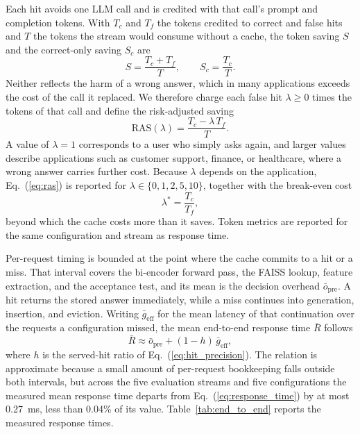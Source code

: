 \documentclass[authoryear,preprint,review,12pt]{elsarticle}
\begin{document}
Each hit avoids one LLM call and is credited with that call's prompt and completion tokens. With $T_c$ and $T_f$ the tokens credited to correct and false hits and $T$ the tokens the stream would consume without a cache, the token saving $S$ and the correct-only saving $S_c$ are
\begin{equation}
S=\frac{T_c+T_f}{T},\qquad S_c=\frac{T_c}{T}.
\label{eq:token_saving}
\end{equation}
Neither reflects the harm of a wrong answer, which in many applications exceeds the cost of the call it replaced. We therefore charge each false hit $\lambda\geq 0$ times the tokens of that call and define the risk-adjusted saving
\begin{equation}
\mathrm{RAS}(\lambda)=\frac{T_c-\lambda\,T_f}{T}.
\label{eq:ras}
\end{equation}
A value of $\lambda=1$ corresponds to a user who simply asks again, and larger values describe applications such as customer support, finance, or healthcare, where a wrong answer carries further cost. Because $\lambda$ depends on the application, Eq.~(\ref{eq:ras}) is reported for $\lambda\in\{0,1,2,5,10\}$, together with the break-even cost
\begin{equation}
\lambda^{*}=\frac{T_c}{T_f},
\label{eq:breakeven}
\end{equation}
beyond which the cache costs more than it saves. Token metrics are reported for the same configuration and stream as response time.

Per-request timing is bounded at the point where the cache commits to a hit or a miss. That interval covers the bi-encoder forward pass, the FAISS lookup, feature extraction, and the acceptance test, and its mean is the decision overhead $\bar{o}_{\mathrm{pre}}$. A hit returns the stored answer immediately, while a miss continues into generation, insertion, and eviction. Writing $\bar{g}_{\mathrm{eff}}$ for the mean latency of that continuation over the requests a configuration missed, the mean end-to-end response time $\bar{R}$ follows
\begin{equation}
\bar{R}\approx\bar{o}_{\mathrm{pre}}+(1-h)\,\bar{g}_{\mathrm{eff}},
\label{eq:response_time}
\end{equation}
where $h$ is the served-hit ratio of Eq.~(\ref{eq:hit_precision}). The relation is approximate because a small amount of per-request bookkeeping falls outside both intervals, but across the five evaluation streams and five configurations the measured mean response time departs from Eq.~(\ref{eq:response_time}) by at most 0.27~ms, less than 0.04\% of its value. Table~\ref{tab:end_to_end} reports the measured response times.
\end{document}
